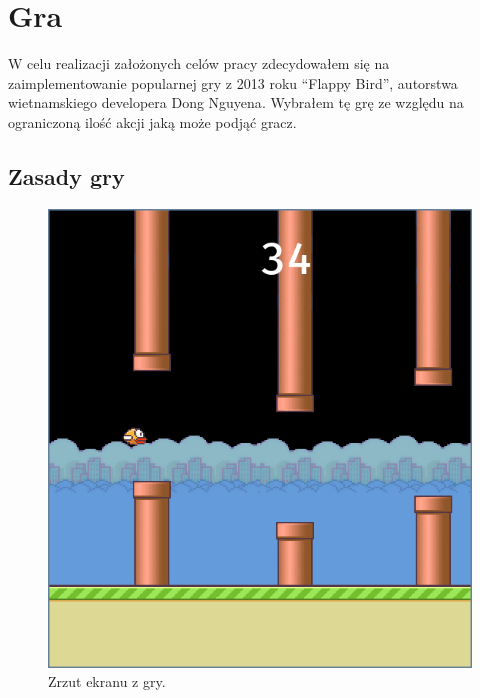 \documentclass[a4paper, 12pt,oneside]{book}
\begin{document}
\chapter{Gra}
\label{chapter:gra}
W celu realizacji założonych celów pracy zdecydowałem się na zaimplementowanie
popularnej gry z 2013 roku ``Flappy Bird'',  autorstwa wietnamskiego developera
Dong Nguyena\cite{flappy_bird_author}. Wybrałem tę grę ze względu na
ograniczoną ilość akcji jaką może podjąć gracz.
\section{Zasady gry} 
\begin{figure}[h] 
	\begin{center}
		\includegraphics[scale=0.40]{flappy_bird.png}
		\caption{Zrzut ekranu z gry.}
		\label{flappy_screenshot}
	\end{center}
\end{figure}
\end{document}
